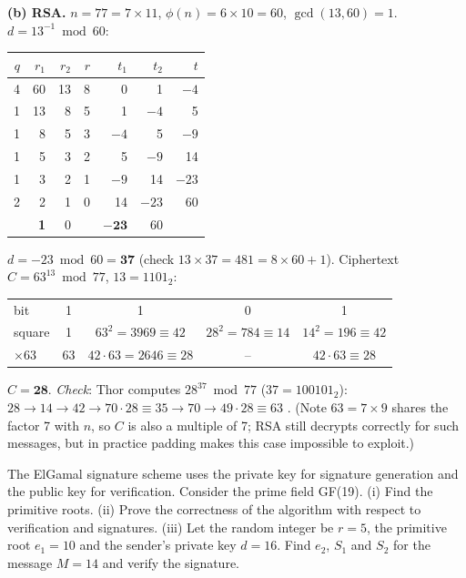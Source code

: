 \textbf{(b) RSA.} $n = 77 = 7 \times 11$, $\phi(n) = 6 \times 10 = 60$, $\gcd(13, 60) = 1$. $d = 13^{-1} \bmod 60$:
\begin{center}\small
\begin{tabular}{@{}rrrrrrr@{}}
\toprule
$q$ & $r_1$ & $r_2$ & $r$ & $t_1$ & $t_2$ & $t$\\
\midrule
4 & 60 & 13 & 8 & 0 & 1 & $-4$\\
1 & 13 & 8 & 5 & 1 & $-4$ & 5\\
1 & 8 & 5 & 3 & $-4$ & 5 & $-9$\\
1 & 5 & 3 & 2 & 5 & $-9$ & 14\\
1 & 3 & 2 & 1 & $-9$ & 14 & $-23$\\
2 & 2 & 1 & 0 & 14 & $-23$ & 60\\
 & \textbf{1} & 0 & & $\mathbf{-23}$ & 60 & \\
\bottomrule
\end{tabular}
\end{center}
$d = -23 \bmod 60 = \mathbf{37}$ (check $13 \times 37 = 481 = 8 \times 60 + 1$).
Ciphertext $C = 63^{13} \bmod 77$, $13 = 1101_2$:
\begin{center}\small
\begin{tabular}{@{}lcccc@{}}
\toprule
bit & 1 & 1 & 0 & 1\\
square & 1 & $63^2 = 3969 \equiv 42$ & $28^2 = 784 \equiv 14$ & $14^2 = 196 \equiv 42$\\
$\times 63$ & 63 & $42 \cdot 63 = 2646 \equiv 28$ & -- & $42 \cdot 63 \equiv 28$\\
\bottomrule
\end{tabular}
\end{center}
$C = \mathbf{28}$. \emph{Check}: Thor computes $28^{37} \bmod 77$ ($37 = 100101_2$): $28 \to 14 \to 42 \to 70 \cdot 28 \equiv 35 \to 70 \to 49 \cdot 28 \equiv 63$ \checkmark. (Note $63 = 7 \times 9$ shares the factor 7 with $n$, so $C$ is also a multiple of 7; RSA still decrypts correctly for such messages, but in practice padding makes this case impossible to exploit.)

\begin{keybox}[title={Q2 (9 marks)}]
The ElGamal signature scheme uses the private key for signature generation and the public key for verification. Consider the prime field GF(19). (i) Find the primitive roots. (ii) Prove the correctness of the algorithm with respect to verification and signatures. (iii) Let the random integer be $r = 5$, the primitive root $e_1 = 10$ and the sender's private key $d = 16$. Find $e_2$, $S_1$ and $S_2$ for the message $M = 14$ and verify the signature.
\end{keybox}

